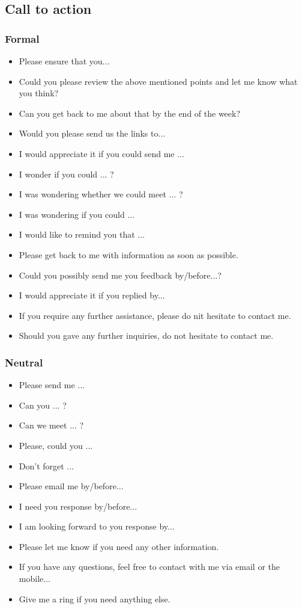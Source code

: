 \subsection{Call to action}

\subsubsection{Formal}
\begin{itemize}
\item Please ensure that you...
\item Could you please review the above mentioned points and let me know what you think?
\item Can you get back to me about that by the end of the week?
\item Would you please send us the links to...
\item I would appreciate it if you could send me ...
\item I wonder if you could ... ?
\item I was wondering whether we could meet ... ?
\item I was wondering if you could ...
\item I would like to remind you that ...
\item Please get back to me with information as soon as possible.
\item Could you possibly send me you feedback by/before...?
\item I would appreciate it if you replied by...
\item If you require any further assistance, please do nit hesitate to contact me.
\item Should you gave any further inquiries, do not hesitate to contact me.
\end{itemize}

\subsubsection{Neutral}
\begin{itemize}
\item Please send me ...
\item Can you ... ?
\item Can we meet ... ?
\item Please, could you ...
\item Don't forget ...
\item Please email me by/before...
\item I need you response by/before...
\item I am looking forward to you response by...
\item Please let me know if you need any other information.
\item If you have any questions, feel free to contact with me via email or the mobile...
\item Give me a ring if you need anything else.
\end{itemize}